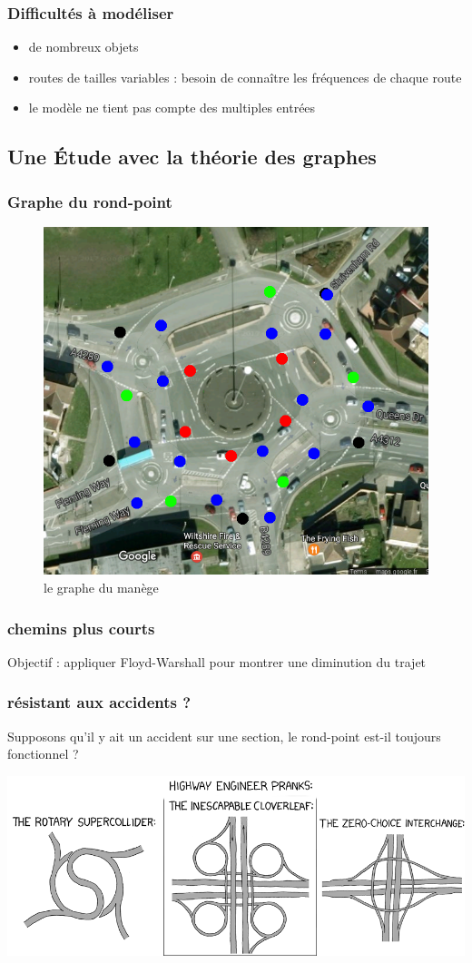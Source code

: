 \documentclass[slidetop,11pt]{beamer}
\begin{document}
\begin{frame}
	\frametitle{Difficultés à modéliser}
	\begin{itemize}
		\item de nombreux objets
		\item routes de tailles variables : besoin de connaître les fréquences de chaque route
		\item le modèle ne tient pas compte des multiples entrées
	\end{itemize}
\end{frame}
	\subsection{Une Étude avec la théorie des graphes}

\begin{frame}
	\frametitle{Graphe du rond-point}
	\begin{figure}
		\begin{center}
			\includegraphics[scale=0.3]{../manege-graphe}
		\end{center}
		\caption{le graphe du manège}
	\end{figure}
\end{frame}

\begin{frame}
	\frametitle{chemins plus courts}
	Objectif : appliquer Floyd-Warshall pour montrer une diminution du trajet
\end{frame}

\begin{frame}
	\frametitle{résistant aux accidents ?}
	Supposons qu'il y ait un accident sur une section, le rond-point est-il toujours fonctionnel ?
\end{frame}

\begin{frame}
	\includegraphics[scale=3]{./images/highway-engineers-pranks-hz}
\end{frame}
\end{document}
